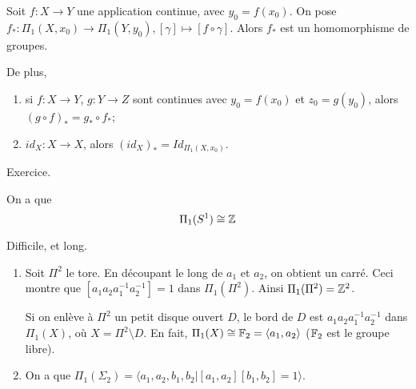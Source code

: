     \begin{prop}
      Soit $f: X \to Y$ une application continue, avec $y_0 = f(x_0)$. On pose $f_\ast: \Pi_1(X, x_0) \to
      \Pi_1(Y, y_0), [\gamma] \mapsto [f \circ \gamma]$. Alors $f_\ast$ est un homomorphisme de groupes.

      De plus, 
      \begin{enumerate}
      \item si $f:X \to Y$, $g: Y \to Z$ sont continues avec $y_0 = f(x_0)$ et $z_0 = g(y_0)$, alors $(g \circ
        f)_\ast = g_\ast \circ f_\ast$;
      \item $id_X : X \to X$, alors $(id_X)_\ast = Id_{\Pi_1(X, x_0)}$.
      \end{enumerate}
    \end{prop}

    \begin{preuve}
      Exercice.
    \end{preuve}

    \begin{theo}
      On a que
        \[\Pi_1(S^1) \cong \Z\]
    \end{theo}

    \begin{preuve}
      Difficile, et long.
    \end{preuve}

    \begin{exs}
      \begin{enumerate}
      \item Soit $\Pi^2$ le tore. En découpant le long de $a_1$ et $a_2$, on obtient un carré. Ceci montre que
        $[a_1a_2a_1^{-1}a_2^{-1}] = 1$ dans $\Pi_1(\Pi^2)$. Ainsi $\Pi_1(\Pi^2) = \Z^2$.

        Si on enlève à $\Pi^2$ un petit disque ouvert $D$, le bord de $D$ est $a_1a_2a_1^{-1}a_2^{-1}$ dans
        $\Pi_1(X)$, où $X = \Pi^2 \setminus D$. En fait, $\Pi_1(X) \cong \F_2 = \langle a_1, a_2 \rangle$
        ($\F_2$ est le groupe libre). 

        
        \begin{center}
        \end{center}

      \item On a que $\Pi_1(\Sigma_2) = \langle a_1, a_2, b_1, b_2 | [a_1, a_2][b_1, b_2] = 1 \rangle$.
        \begin{center}
          \begin{tikzpicture}
          \end{tikzpicture}
        \end{center}
      \end{enumerate}
    \end{exs}

